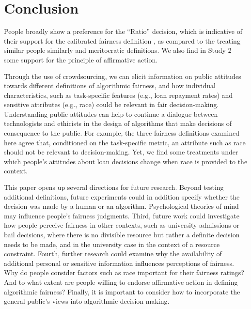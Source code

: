 \documentclass[letterpaper]{article} %
\begin{document}

\section{Conclusion} 

People broadly show a preference for the ``Ratio'' decision, which is
indicative of their support for the calibrated fairness definition
\cite{liu2017calibrated}, as compared to the treating similar people
similarly \cite{dwork2012fairness} and meritocratic
\citeauthor{joseph2016fairness} definitions. We also find in Study 2
some support for the principle of affirmative action.



Through the use of crowdsourcing, we can elicit information on public
attitudes towards different definitions of algorithmic fairness, and
how individual characteristics, such as task-specific features (e.g.,
loan repayment rates) and sensitive attributes (e.g., race) could be
relevant in fair decision-making. Understanding public attitudes can
help to continue a dialogue between technologists and ethicists in the
design of algorithms that make decisions of consequence to the public.
For example, the three fairness definitions examined here agree that,
conditioned on the task-specific metric, an attribute such as race
should not be relevant to decision-making. Yet, we find some
treatments under which people's attitudes about loan decisions change
when race is provided to the context.

This paper opens up several directions for future research. Beyond testing additional definitions, future experiments could in addition specify whether the decision was made by a human or an algorithm. Psychological theories of mind may influence people's fairness judgments. Third, future work could investigate how people perceive fairness in other contexts, such as university admissions or bail decisions, where there is no divisible resource but rather a definite decision needs to be made, and in the university case in the context of a resource constraint. Fourth, further research could examine why the availability of additional personal or sensitive information influences perceptions of fairness. Why do people consider factors such as race important for their fairness ratings? And to what extent are people willing to endorse affirmative action in defining algorithmic fairness? Finally, it is important to consider how to incorporate the general public's views into algorithmic decision-making. 
\end{document}
